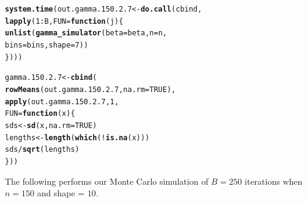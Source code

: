 \documentclass[11pt]{article}\usepackage[]{graphicx}\usepackage[]{color}
\makeatletter
\newcommand{\hlnum}[1]{\textcolor[rgb]{0.686,0.059,0.569}{#1}}%
\newcommand{\hlopt}[1]{\textcolor[rgb]{0,0,0}{#1}}%
\newcommand{\hlstd}[1]{\textcolor[rgb]{0.345,0.345,0.345}{#1}}%
\newcommand{\hlkwa}[1]{\textcolor[rgb]{0.161,0.373,0.58}{\textbf{#1}}}%
\newcommand{\hlkwb}[1]{\textcolor[rgb]{0.69,0.353,0.396}{#1}}%
\newcommand{\hlkwc}[1]{\textcolor[rgb]{0.333,0.667,0.333}{#1}}%
\newcommand{\hlkwd}[1]{\textcolor[rgb]{0.737,0.353,0.396}{\textbf{#1}}}%
\newenvironment{kframe}{%
 \def\at@end@of@kframe{}%
 \ifinner\ifhmode%
  \def\at@end@of@kframe{\end{minipage}}%
  \begin{minipage}{\columnwidth}%
 \fi\fi%
 \def\FrameCommand##1{\hskip\@totalleftmargin \hskip-\fboxsep
 \colorbox{shadecolor}{##1}\hskip-\fboxsep
     \hskip-\linewidth \hskip-\@totalleftmargin \hskip\columnwidth}%
 \MakeFramed {\advance\hsize-\width
   \@totalleftmargin\z@ \linewidth\hsize
   \@setminipage}}%
 {\par\unskip\endMakeFramed%
 \at@end@of@kframe}
\newenvironment{knitrout}{}{} %
\makeatother
\begin{document}
\begin{knitrout}
\color{fgcolor}\begin{kframe}
\begin{alltt}
\hlkwd{system.time}\hlstd{(out.gamma.150.2.7} \hlkwb{<-} \hlkwd{do.call}\hlstd{(cbind,}
  \hlkwd{lapply}\hlstd{(}\hlnum{1}\hlopt{:}\hlstd{B,} \hlkwc{FUN} \hlstd{=} \hlkwa{function}\hlstd{(}\hlkwc{j}\hlstd{)\{}
    \hlkwd{unlist}\hlstd{(}\hlkwd{gamma_simulator}\hlstd{(}\hlkwc{beta} \hlstd{= beta,} \hlkwc{n} \hlstd{= n,}
      \hlkwc{bins} \hlstd{= bins,} \hlkwc{shape} \hlstd{=} \hlnum{7}\hlstd{))}
\hlstd{\})))}
\end{alltt}


{\ttfamily\noindent\bfseries\color{errorcolor}{\#\# Error in eval(family\$initialize): non-positive values not allowed for the 'gamma' family}}

{\ttfamily\noindent\itshape\color{messagecolor}{\#\# Timing stopped at: 0.004 0 0.003}}\end{kframe}
\end{knitrout}

\begin{knitrout}
\color{fgcolor}\begin{kframe}
\begin{alltt}
\hlstd{gamma.150.2.7} \hlkwb{<-} \hlkwd{cbind}\hlstd{(}
  \hlkwd{rowMeans}\hlstd{(out.gamma.150.2.7,} \hlkwc{na.rm} \hlstd{=} \hlnum{TRUE}\hlstd{),}
  \hlkwd{apply}\hlstd{(out.gamma.150.2.7,} \hlnum{1}\hlstd{,}
  \hlkwc{FUN} \hlstd{=} \hlkwa{function}\hlstd{(}\hlkwc{x}\hlstd{)\{}
    \hlstd{sds} \hlkwb{<-} \hlkwd{sd}\hlstd{(x,} \hlkwc{na.rm} \hlstd{=} \hlnum{TRUE}\hlstd{)}
    \hlstd{lengths} \hlkwb{<-} \hlkwd{length}\hlstd{(}\hlkwd{which}\hlstd{(}\hlopt{!}\hlkwd{is.na}\hlstd{(x)))}
    \hlstd{sds} \hlopt{/} \hlkwd{sqrt}\hlstd{(lengths)}
  \hlstd{\}))}
\end{alltt}


{\ttfamily\noindent\bfseries\color{errorcolor}{\#\# Error in is.data.frame(x): object 'out.gamma.150.2.7' not found}}\end{kframe}
\end{knitrout}

The following performs our Monte Carlo simulation of $B = 250$ iterations 
when $n = 150$ and shape = $10$.
\end{document}
